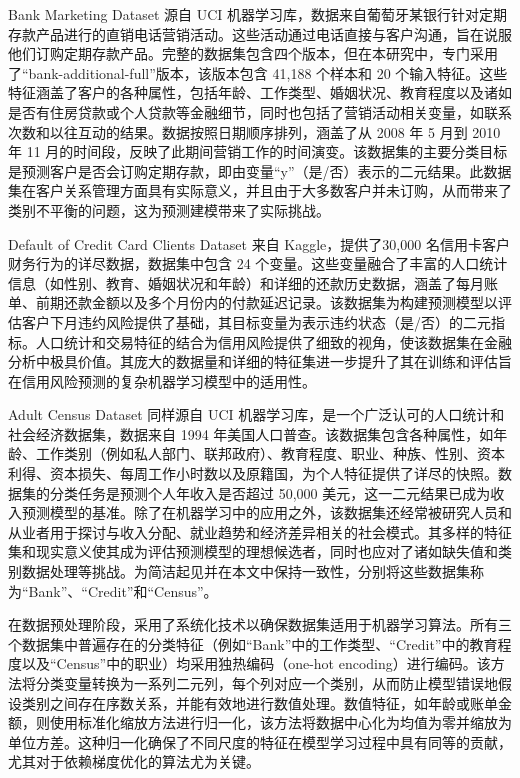 Bank Marketing Dataset 源自 UCI 机器学习库，数据来自葡萄牙某银行针对定期存款产品进行的直销电话营销活动。这些活动通过电话直接与客户沟通，旨在说服他们订购定期存款产品。完整的数据集包含四个版本，但在本研究中，专门采用了“bank-additional-full”版本，该版本包含 41,188 个样本和 20 个输入特征。这些特征涵盖了客户的各种属性，包括年龄、工作类型、婚姻状况、教育程度以及诸如是否有住房贷款或个人贷款等金融细节，同时也包括了营销活动相关变量，如联系次数和以往互动的结果。数据按照日期顺序排列，涵盖了从 2008 年 5 月到 2010 年 11 月的时间段，反映了此期间营销工作的时间演变。该数据集的主要分类目标是预测客户是否会订购定期存款，即由变量“y”（是/否）表示的二元结果。此数据集在客户关系管理方面具有实际意义，并且由于大多数客户并未订购，从而带来了类别不平衡的问题，这为预测建模带来了实际挑战。

Default of Credit Card Clients Dataset 来自 Kaggle，提供了30,000 名信用卡客户财务行为的详尽数据，数据集中包含 24 个变量。这些变量融合了丰富的人口统计信息（如性别、教育、婚姻状况和年龄）和详细的还款历史数据，涵盖了每月账单、前期还款金额以及多个月份内的付款延迟记录。该数据集为构建预测模型以评估客户下月违约风险提供了基础，其目标变量为表示违约状态（是/否）的二元指标。人口统计和交易特征的结合为信用风险提供了细致的视角，使该数据集在金融分析中极具价值。其庞大的数据量和详细的特征集进一步提升了其在训练和评估旨在信用风险预测的复杂机器学习模型中的适用性。

Adult Census Dataset 同样源自 UCI 机器学习库，是一个广泛认可的人口统计和社会经济数据集，数据来自 1994 年美国人口普查。该数据集包含各种属性，如年龄、工作类别（例如私人部门、联邦政府）、教育程度、职业、种族、性别、资本利得、资本损失、每周工作小时数以及原籍国，为个人特征提供了详尽的快照。数据集的分类任务是预测个人年收入是否超过 50,000 美元，这一二元结果已成为收入预测模型的基准。除了在机器学习中的应用之外，该数据集还经常被研究人员和从业者用于探讨与收入分配、就业趋势和经济差异相关的社会模式。其多样的特征集和现实意义使其成为评估预测模型的理想候选者，同时也应对了诸如缺失值和类别数据处理等挑战。为简洁起见并在本文中保持一致性，分别将这些数据集称为“Bank”、“Credit”和“Census”。

在数据预处理阶段，采用了系统化技术以确保数据集适用于机器学习算法。所有三个数据集中普遍存在的分类特征（例如“Bank”中的工作类型、“Credit”中的教育程度以及“Census”中的职业）均采用独热编码（one-hot encoding）进行编码。该方法将分类变量转换为一系列二元列，每个列对应一个类别，从而防止模型错误地假设类别之间存在序数关系，并能有效地进行数值处理。数值特征，如年龄或账单金额，则使用标准化缩放方法进行归一化，该方法将数据中心化为均值为零并缩放为单位方差。这种归一化确保了不同尺度的特征在模型学习过程中具有同等的贡献，尤其对于依赖梯度优化的算法尤为关键。

